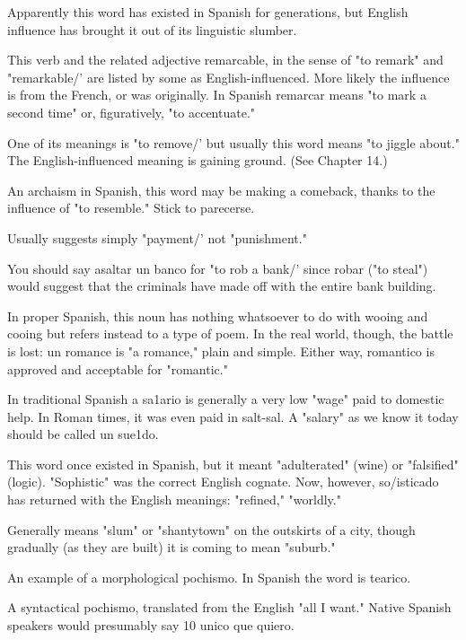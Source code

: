 { Apparently this word has existed in Spanish
for generations, but English influence has brought it out of its linguistic slumber.

 This verb and the related adjective remarcable,
in the sense of "to remark" and "remarkable/' are listed by some as
English-influenced. More likely the influence is from the French, or
was originally. In Spanish remarcar means "to mark a second time"
or, figuratively, "to accentuate."

 One of its meanings is "to remove/' but usually
this word means "to jiggle about." The English-influenced meaning is
gaining ground. (See Chapter 14.)

 An archaism in Spanish, this word may be
making a comeback, thanks to the influence of "to resemble." Stick to
parecerse.

 Usually suggests simply "payment/' not
"punishment."

 You should say asaltar un banco for "to
rob a bank/' since robar ("to steal") would suggest that the criminals
have made off with the entire bank building.

 In proper Spanish, this noun has nothing whatsoever to do with wooing and cooing but refers instead to a type of
poem. In the real world, though, the battle is lost: un romance is "a
romance," plain and simple. Either way, romantico is approved and acceptable for "romantic."

 In traditional Spanish a sa1ario is generally a very
low "wage" paid to domestic help. In Roman times, it was even paid in
salt-sal. A "salary" as we know it today should be called un sue1do.

 This word once existed in Spanish, but it
meant "adulterated" (wine) or "falsified" (logic). "Sophistic" was
the correct English cognate. Now, however, so/isticado has returned
with the English meanings: "refined," "worldly."

 Generally means "slum" or "shantytown" on the
outskirts of a city, though gradually (as they are built) it is coming to
mean "suburb."

 An example of a morphological pochismo. In
Spanish the word is tearico.

 A syntactical pochismo, translated
from the English "all I want." Native Spanish speakers would presumably say 10 unico que quiero.

}
